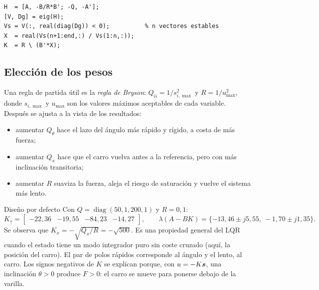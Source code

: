 \begin{lstlisting}[caption={Resolución de Riccati sin toolboxes (extracto de \code{cp\_lqr.m}).}]
H  = [A, -B/R*B'; -Q, -A'];
[V, Dg] = eig(H);
Vs = V(:, real(diag(Dg)) < 0);          % n vectores estables
X  = real(Vs(n+1:end,:) / Vs(1:n,:));
K  = R \ (B'*X);
\end{lstlisting}

\subsection{Elección de los pesos}

Una regla de partida útil es la \emph{regla de Bryson}: $Q_{ii}=1/s_{i,\max}^2$ y $R=1/u_{\max}^2$, donde $s_{i,\max}$ y $u_{\max}$ son los valores máximos aceptables de cada variable. Después se ajusta a la vista de los resultados:
\begin{itemize}
  \item aumentar $Q_{\theta}$ hace el lazo del ángulo más rápido y rígido, a costa de más fuerza;
  \item aumentar $Q_x$ hace que el carro vuelva antes a la referencia, pero con más inclinación transitoria;
  \item aumentar $R$ suaviza la fuerza, aleja el riesgo de saturación y vuelve el sistema más lento.
\end{itemize}

\begin{ejemplo}{Diseño por defecto}
Con $Q=\operatorname{diag}(50,1,200,1)$ y $R=0{,}1$:
\[
K_\uparrow = \begin{bmatrix}-22{,}36 & -19{,}55 & -84{,}23 & -14{,}27\end{bmatrix},\qquad
\lambda(A-BK)=\{-13{,}46\pm j5{,}55,\ -1{,}70\pm j1{,}35\}.
\]
Se observa que $K_x=-\sqrt{Q_x/R}=-\sqrt{500}$. Es una propiedad general del LQR cuando el estado tiene un modo integrador puro sin coste cruzado (aquí, la posición del carro). El par de polos rápidos corresponde al ángulo y el lento, al carro. Los signos negativos de $K$ se explican porque, con $u=-K\bm{s}$, una inclinación $\theta>0$ produce $F>0$: el carro se mueve para ponerse debajo de la varilla.
\end{ejemplo}

